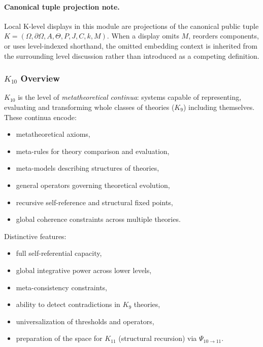 



\paragraph{Canonical tuple projection note.}
Local K-level displays in this module are projections of the canonical public tuple \(K=(\Omega,\partial\Omega,A,\Theta,P,J,C,k,M)\). When a display omits \(M\), reorders components, or uses level-indexed shorthand, the omitted embedding context is inherited from the surrounding level discussion rather than introduced as a competing definition.

\subsubsection{$K_{10}$ Overview}
\label{sec:k10-overview}

$K_{10}$ is the level of \emph{metatheoretical continua}: systems capable of
representing, evaluating and transforming whole classes of theories ($K_9$)
including themselves. These continua encode:
\begin{itemize}
    \item metatheoretical axioms,
    \item meta-rules for theory comparison and evaluation,
    \item meta-models describing structures of theories,
    \item general operators governing theoretical evolution,
    \item recursive self-reference and structural fixed points,
    \item global coherence constraints across multiple theories.
\end{itemize}

Distinctive features:
\begin{itemize}
    \item full self-referential capacity,
    \item global integrative power across lower levels,
    \item meta-consistency constraints,
    \item ability to detect contradictions in $K_9$ theories,
    \item universalization of thresholds and operators,
    \item preparation of the space for $K_{11}$ (structural recursion) via $\Psi_{10\to11}$.
\end{itemize}

